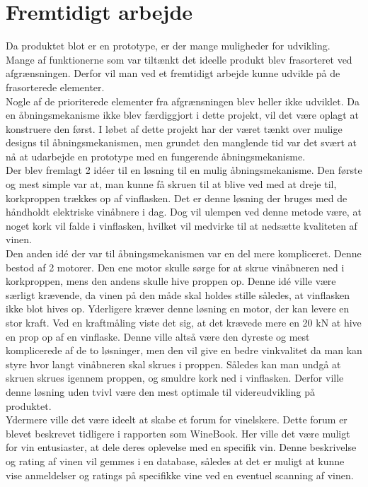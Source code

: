\chapter{Fremtidigt arbejde}

Da produktet blot er en prototype, er der mange muligheder for udvikling. Mange af funktionerne som var tiltænkt det ideelle 
produkt blev frasorteret ved afgrænsningen. Derfor vil man ved et fremtidigt arbejde kunne udvikle på de frasorterede elementer.
\\

Nogle af de prioriterede elementer fra afgrænsningen blev heller ikke udviklet. Da en åbningsmekanisme ikke blev færdiggjort i 
dette projekt, vil det være oplagt at konstruere den først. I løbet af dette projekt har der været tænkt over mulige designs til 
åbningsmekanismen, men grundet den manglende tid var det svært at nå at udarbejde en prototype med en fungerende åbningsmekanisme. 
\\

Der blev fremlagt 2 idéer til en løsning til en mulig åbningsmekanisme. Den første og mest simple var at, man kunne få skruen til 
at blive ved med at dreje til, korkproppen trækkes op af vinflasken. Det er denne løsning der bruges med de håndholdt elektriske 
vinåbnere i dag. Dog vil ulempen ved denne metode være, at noget kork vil falde i vinflasken, hvilket vil medvirke til at 
nedsætte kvaliteten af vinen.
\\

Den anden idé der var til åbningsmekanismen var en del mere kompliceret. Denne bestod af 2 motorer. Den ene motor skulle sørge 
for at skrue vinåbneren ned i korkproppen, mens den andens skulle hive proppen op. Denne idé ville være særligt krævende, da 
vinen på den måde skal holdes stille således, at vinflasken ikke blot hives op. Yderligere kræver denne løsning en motor, der 
kan levere en stor kraft. Ved en kraftmåling viste det sig, at det krævede mere en 20 kN at hive en prop op af en vinflaske. 
Denne ville altså være den dyreste og mest komplicerede af de to løsninger, men den vil give en bedre vinkvalitet da man kan 
styre hvor langt vinåbneren skal skrues i proppen. Således kan man undgå at skruen skrues igennem proppen, og smuldre kork ned 
i vinflasken. Derfor ville denne løsning uden tvivl være den mest optimale til videreudvikling på produktet.
\\

Ydermere ville det være ideelt at skabe et forum for vinelskere. Dette forum er blevet beskrevet tidligere i rapporten som 
WineBook. Her ville det være muligt for vin entusiaster, at dele deres oplevelse med en specifik vin. Denne beskrivelse og 
rating af vinen vil gemmes i en database, således at det er muligt at kunne vise anmeldelser og ratings på specifikke vine ved 
en eventuel scanning af vinen.
\\

